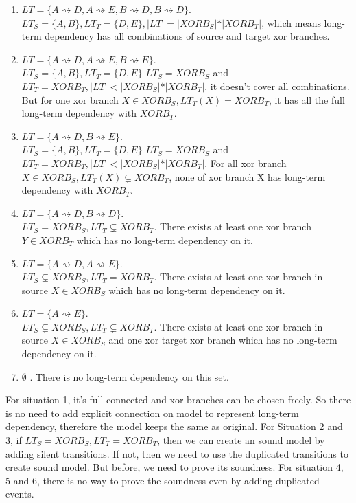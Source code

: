 \begin{enumerate}
	\item $LT=\{ A\rightsquigarrow D, A\rightsquigarrow E, B\rightsquigarrow D, B\rightsquigarrow D\}$. \\
	$LT_S = \{A,B\}, LT_T=\{D,E\}, \vert LT \vert = \vert XORB_S \vert * \vert XORB_T \vert  $, which means long-term dependency has all combinations of source and target xor branches. 
	\item $LT=\{ A\rightsquigarrow D, A\rightsquigarrow E, B\rightsquigarrow E\}. $\\
	$LT_S = \{A,B\}, LT_T=\{D,E\}$
	$LT_S = XORB_S $ and $LT_T = XORB_T, \vert LT \vert < \vert XORB_S \vert * \vert XORB_T \vert $. it doesn't cover all combinations. But for one xor branch $X \in XORB_S, LT_T(X)= XORB_T$, it has all the full long-term dependency with $XORB_T$. 
	\item $LT=\{ A\rightsquigarrow D, B\rightsquigarrow E\}. $\\
	$LT_S = \{A,B\}, LT_T=\{D,E\}$
	$LT_S = XORB_S $ and $LT_T = XORB_T, \vert LT \vert < \vert XORB_S \vert * \vert XORB_T \vert $. For all xor branch $X \in XORB_S, LT_T(X) \subsetneq XORB_T$, none of xor branch X has long-term dependency with $XORB_T$.
	\item $LT=\{ A\rightsquigarrow D, B\rightsquigarrow D\}.$ \\
	$LT_S = XORB_S ,  LT_T \subsetneq XORB_T$. There exists at least one xor branch $Y \in XORB_T$ which has no long-term dependency on it.
	\item $LT=\{ A\rightsquigarrow D, A\rightsquigarrow E\}.$ \\
	$LT_S \subsetneq XORB_S ,  LT_T = XORB_T$.
	There exists at least one xor branch in source $X \in XORB_S$ which has no long-term dependency on it.
	\item $LT=\{ A\rightsquigarrow E\}. $\\
	$LT_S \subsetneq XORB_S ,  LT_T \subsetneq XORB_T$.
	There exists at least one xor branch in source $X \in XORB_S$  and one xor target xor branch which has no long-term dependency on it.
	\item $ \emptyset$ . There is no long-term dependency on this set. 
\end{enumerate}

For situation 1, it's full connected and xor branches can be chosen freely. So there is no need to add explicit connection on model to represent long-term dependency, therefore the model keeps the same as original. 
For Situation 2 and 3, if $LT_S = XORB_S, LT_T= XORB_T$, then we can create an sound model by adding silent transitions. If not, then we need to use the duplicated transitions to create sound model. But before, we need to prove its soundness. 
For situation 4, 5 and 6, there is no way to prove the soundness even by adding duplicated events.

